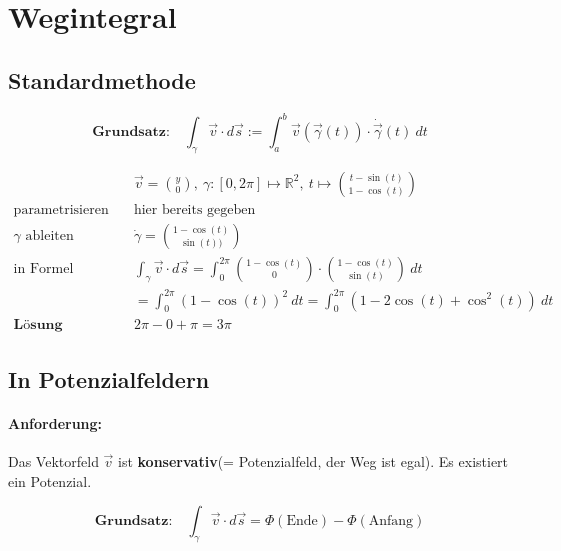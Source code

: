 \documentclass[11pt]{article}
\begin{document}
\section{Wegintegral}

\subsection{Standardmethode}

\begin{equation*}
	\textbf{Grundsatz:}\quad \int_\gamma \vec{v}\cdot d\vec{s} := \int_a^b \vec{v}(\vec{\gamma}(t)) \cdot \dot\vec{\gamma}(t)\ dt
\end{equation*}

\begin{equation*}
\begin{split}
	& \vec{v} = \binom{y}{0},\ \gamma:[0, 2\pi] \mapsto \mathbb{R}^2,\ t \mapsto \binom{t -\sin(t)}{1-\cos(t)} \\
	\text{parametrisieren}\quad & \text{hier bereits gegeben} \\
	\text{$\gamma$ ableiten}\quad & \dot\gamma = \binom{1-\cos(t)}{\sin(t))} \\
	\text{in Formel einsetzen}\quad & \int_\gamma \vec{v} \cdot d\vec{s} = \int_0^{2\pi} \binom{1-\cos(t)}{0}\cdot\binom{1-\cos(t)}{\sin(t)}\ dt \\
	&= \int_0^{2\pi} (1-\cos(t))^2\ dt = \int_0^{2\pi} (1-2\cos(t)+\cos^2(t))\ dt \\
	\textbf{L{\"o}sung}\quad & 2\pi - 0 + \pi = 3\pi
\end{split}
\end{equation*}

\subsection{In Potenzialfeldern}

\paragraph{Anforderung:} Das Vektorfeld $\vec{v}$ ist \textbf{konservativ}(= Potenzialfeld, der Weg ist egal). Es existiert ein Potenzial.

\begin{equation*}
	\textbf{Grundsatz:}\quad\int_\gamma \vec{v} \cdot d\vec{s} = \Phi(\text{Ende}) - \Phi(\text{Anfang})
\end{equation*}
\end{document}
